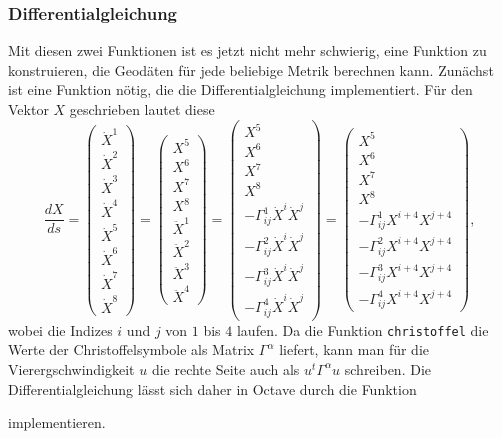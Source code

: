 \subsubsection{Differentialgleichung}
Mit diesen zwei Funktionen ist es jetzt nicht mehr schwierig, eine Funktion
zu konstruieren, die Geodäten für jede beliebige Metrik berechnen kann.
Zunächst ist eine Funktion nötig, die die Differentialgleichung implementiert.
Für den Vektor $X$ geschrieben lautet diese
\[
\frac{dX}{ds}
=
\begin{pmatrix}
\dot X^1\\
\dot X^2\\
\dot X^3\\
\dot X^4\\
\dot X^5\\
\dot X^6\\
\dot X^7\\
\dot X^8
\end{pmatrix}
=
\begin{pmatrix}
X^5\\X^6\\X^7\\X^8
\\
\ddot X^1\\
\ddot X^2\\
\ddot X^3\\
\ddot X^4
\end{pmatrix}
=
\begin{pmatrix}
X^5\\X^6\\X^7\\X^8
\\
-\Gamma^1_{ij}\dot X^{i}\dot X^{j}\\
-\Gamma^2_{ij}\dot X^{i}\dot X^{j}\\
-\Gamma^3_{ij}\dot X^{i}\dot X^{j}\\
-\Gamma^4_{ij}\dot X^{i}\dot X^{j}
\end{pmatrix}
=
\begin{pmatrix}
X^5\\X^6\\X^7\\X^8
\\
-\Gamma^1_{ij}X^{i+4}X^{j+4}\\
-\Gamma^2_{ij}X^{i+4}X^{j+4}\\
-\Gamma^3_{ij}X^{i+4}X^{j+4}\\
-\Gamma^4_{ij}X^{i+4}X^{j+4}
\end{pmatrix},
\]
wobei die Indizes $i$ und $j$ von $1$ bis $4$ laufen.
Da die Funktion \texttt{christoffel} die Werte der Christoffelsymbole
als Matrix $\Gamma^\alpha$ liefert, kann man für die Vierergschwindigkeit
$u$ die rechte Seite auch als $u^t \Gamma^\alpha u$ schreiben.
Die Differentialgleichung lässt sich daher in Octave durch die
Funktion

implementieren.

